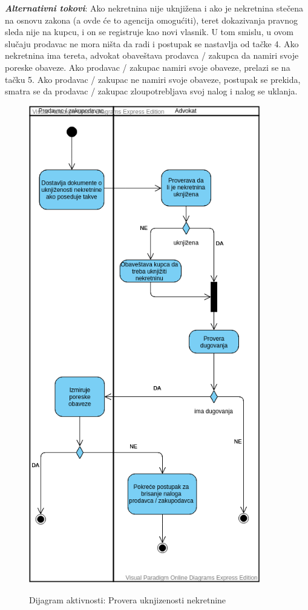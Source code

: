 \documentclass[20pt]{article}
\begin{document}
\textbf{\textit{Alternativni tokovi}}: Ako nekretnina nije uknji\v zena i ako je nekretnina ste\v cena na osnovu zakona (a ovde \' ce to agencija omogu\' citi), teret dokazivanja pravnog sleda nije na kupcu, i on se registruje kao novi vlasnik. U tom smislu, u ovom slu\v caju prodavac ne mora ni\v sta da radi i postupak se nastavlja od ta\v cke 4. Ako nekretnina ima tereta, advokat obave\v stava prodavca / zakupca da namiri svoje poreske obaveze. Ako prodavac / zakupac namiri svoje obaveze, prelazi se na ta\v cku 5. Ako prodavac / zakupac ne namiri svoje obaveze, postupak se prekida, smatra se da prodavac / zakupac zloupotrebljava svoj nalog i nalog se uklanja. \\

\begin{figure}[h]
        \centering
        \includegraphics[width=0.9\textwidth,height=0.6\textheight]{Pictures/DijagramAktivnostiProveraUknjizenosti.png}\\
        \caption{Dijagram aktivnosti: Provera uknjizenosti nekretnine}
        \label{fig:dijagramAktivnostiProveraUknjizenosti}
    \end{figure}
\newpage
\end{document}
